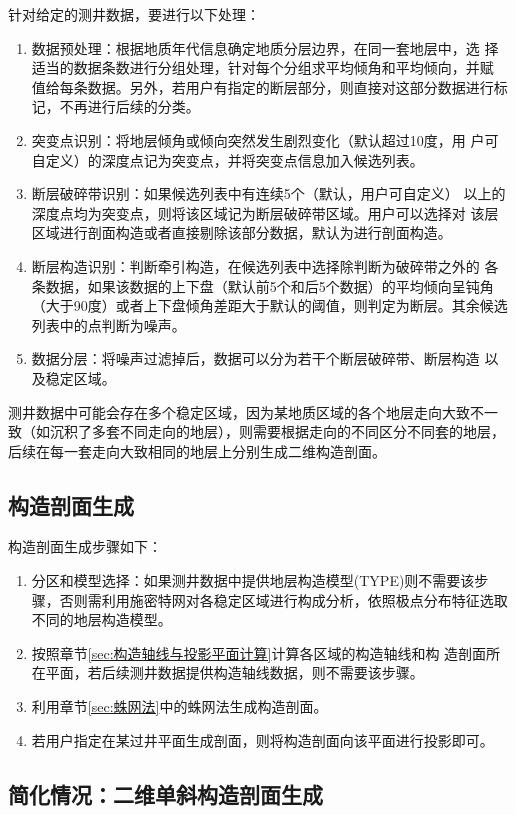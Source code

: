\documentclass[a4paper,twoside]{ctexart}
\begin{document}
针对给定的测井数据，要进行以下处理：
\begin{enumerate}[步骤 1:]
\item 数据预处理：根据地质年代信息确定地质分层边界，在同一套地层中，选
  择适当的数据条数进行分组处理，针对每个分组求平均倾角和平均倾向，并赋
  值给每条数据。另外，若用户有指定的断层部分，则直接对这部分数据进行标
  记，不再进行后续的分类。
\item 突变点识别：将地层倾角或倾向突然发生剧烈变化（默认超过10度，用
  户可自定义）的深度点记为突变点，并将突变点信息加入候选列表。
\item 断层破碎带识别：如果候选列表中有连续5个（默认，用户可自定义）
  以上的深度点均为突变点，则将该区域记为断层破碎带区域。用户可以选择对
  该层区域进行剖面构造或者直接剔除该部分数据，默认为进行剖面构造。
\item 断层构造识别：判断牵引构造，在候选列表中选择除判断为破碎带之外的
  各条数据，如果该数据的上下盘（默认前5个和后5个数据）的平均倾向呈钝角
  （大于90度）或者上下盘倾角差距大于默认的阈值，则判定为断层。其余候选
  列表中的点判断为噪声。
\item 数据分层：将噪声过滤掉后，数据可以分为若干个断层破碎带、断层构造
  以及稳定区域。 
\end{enumerate}

测井数据中可能会存在多个稳定区域，因为某地质区域的各个地层走向大致不一
致（如沉积了多套不同走向的地层），则需要根据走向的不同区分不同套的地层，
后续在每一套走向大致相同的地层上分别生成二维构造剖面。

\subsection{构造剖面生成}

构造剖面生成步骤如下：
\begin{enumerate}[步骤 1:]
\item 分区和模型选择：如果测井数据中提供地层构造模型(TYPE)则不需要该步
  骤，否则需利用施密特网对各稳定区域进行构成分析，依照极点分布特征选取
  不同的地层构造模型。 
\item 按照章节\ref{sec:构造轴线与投影平面计算}计算各区域的构造轴线和构
  造剖面所在平面，若后续测井数据提供构造轴线数据，则不需要该步骤。
\item 利用章节\ref{sec:蛛网法}中的蛛网法生成构造剖面。
\item 若用户指定在某过井平面生成剖面，则将构造剖面向该平面进行投影即可。
\end{enumerate}

\subsection{简化情况：二维单斜构造剖面生成}
\end{document}

